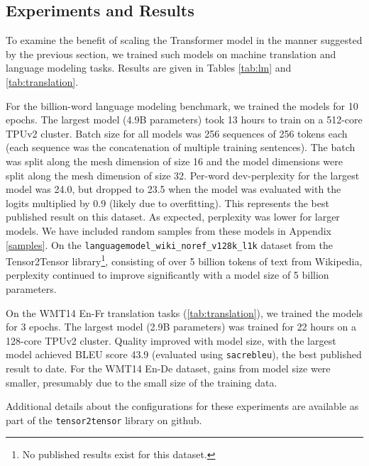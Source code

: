 \documentclass{article}
\begin{document}
\begin{itemize}
\subsection{Experiments and Results} \label{sec:results}
To examine the benefit of scaling the Transformer model in the manner suggested by the previous section, we trained such models on machine translation and language modeling tasks.  Results are given in Tables \ref{tab:lm} and \ref{tab:translation}.   

For the billion-word language modeling benchmark, we trained the models for 10 epochs.  The largest model (4.9B parameters) took 13 hours to train on a 512-core TPUv2 cluster.  Batch size for all models was 256 sequences of 256 tokens each (each sequence was the concatenation of multiple training sentences).  The batch was split along the mesh dimension of size 16 and the model dimensions were split along the mesh dimension of size 32.  Per-word dev-perplexity for the largest model was 24.0, but dropped to 23.5 when the model was evaluated with the logits multiplied by 0.9 (likely due to overfitting).  This represents the best published result on this dataset.  As expected, perplexity was lower for larger models.  We have included random samples from these models in Appendix \ref{samples}.   On the \texttt{languagemodel\_wiki\_noref\_v128k\_l1k} dataset from the Tensor2Tensor library\footnote{No published results exist for this dataset.}, consisting of over 5 billion tokens of text from Wikipedia, perplexity continued to improve significantly with a model size of 5 billion parameters.  

On the WMT14 En-Fr translation tasks (\ref{tab:translation}), we trained the models for 3 epochs.   The largest model (2.9B parameters) was trained for 22 hours on a 128-core TPUv2 cluster.  Quality improved with model size, with the largest model achieved BLEU score 43.9 (evaluated using \texttt{sacrebleu}), the best published result to date.  For the WMT14 En-De dataset, gains from model size were smaller, presumably due to the small size of the training data.

Additional details about the configurations for these experiments are available as part of the \texttt{tensor2tensor} library on github.





\end{itemize}
\end{document}
